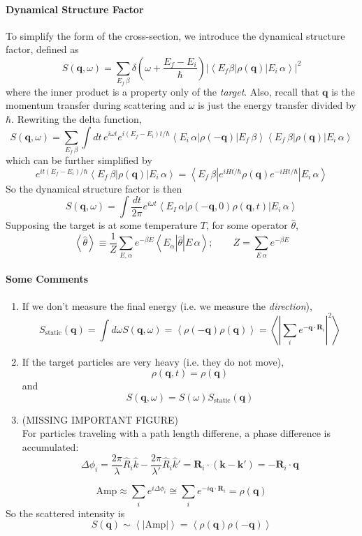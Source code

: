 \documentclass{article}
\begin{document}
			\paragraph{Dynamical Structure Factor} To simplify the form of the cross-section, we introduce the dynamical structure factor, defined as
			$$S(\mathbf{q},\omega)=\sum_{E_f\,\beta}\delta\left(\omega+\frac{E_f-E_i}{\hbar}\right)\left|\left<E_f\beta\left|\rho(\mathbf{q})\right|E_i\,\alpha\right>\right|^2$$
			where the inner product is a property only of the \emph{target}. Also, recall that $\mathbf{q}$ is the momentum transfer during scattering and $\omega$ is just the energy transfer divided by $\hbar$. Rewriting the delta function,
			$$S(\mathbf{q},\omega)=\sum_{E_f\,\beta}\int dt\,e^{i\omega t}e^{i(E_f-E_i)t/\hbar}\left<E_i\,\alpha\left|\rho(-\mathbf{q})\right|E_f\,\beta\right>\left<E_{f}\,\beta\left|\rho(\mathbf{q})\right|E_i\,\alpha\right>$$
			which can be further simplified by
			$$e^{it(E_f-E_i)/\hbar}\left<E_{f}\,\beta\left|\rho(\mathbf{q})\right|E_i\,\alpha\right>=\left<E_{f}\,\beta\left|e^{i Ht/\hbar}\rho(\mathbf{q})e^{-iHt/\hbar}\right|E_i\,\alpha\right>$$
			So the dynamical structure factor is then
			$$S(\mathbf{q},\omega)=\int \frac{dt}{2\pi}e^{i\omega t}\left<E_I\,\alpha\left|\rho(-\mathbf{q},0)\rho(\mathbf{q},t)\right|E_i\,\alpha\right>$$
			Supposing the target is at some temperature $T$, for some operator $\hat{\theta}$,
			$$\left<\hat{\theta}\right>\equiv \frac{1}{Z}\sum_{E,\alpha}e^{-\beta E}\left<E_\alpha\left|\hat{\theta}\right|E\,\alpha\right>;\qquad Z=\sum_{E\,\alpha}e^{-\beta E}$$
			\begin{center}
			\end{center}
			\paragraph{Some Comments}
			\begin{enumerate}
				\item If we don't measure the final energy (i.e. we measure the \emph{direction}),
				$$S_{\mathrm{static}}(\mathbf{q})=\int d\omega S(\mathbf{q},\omega)=\left<\rho(-\mathbf{q})\rho(\mathbf{q})\right>=\left<\left|\sum_ie^{-\mathbf{q}\cdot\mathbf{R}_i}\right|^2\right>$$
				\item If the target particles are very heavy (i.e. they do not move),
				$$\rho(\mathbf{q},t)=\rho(\mathbf{q})$$
				and
				$$S(\mathbf{q},\omega)=S(\omega)S_{\mathrm{static}}(\mathbf{q})$$
				\item (MISSING IMPORTANT FIGURE)\\
				
				\noindent For particles traveling with a path length differene, a phase difference is accumulated:
				$$\Delta \phi_i=\frac{2\pi}{\lambda}\hat{R}_i\hat{k}-\frac{2\pi}{\lambda'}\hat{R}_i\hat{k}'=\mathbf{R}_i\cdot(\mathbf{k}-\mathbf{k}')=-\mathbf{R}_i\cdot\mathbf{q}$$
			\end{enumerate}
			$$\mathrm{Amp}\approx \sum_i e^{i\Delta\phi_i}\cong \sum_ie^{-i\mathbf{q}\cdot\mathbf{R}_i}=\rho(\mathbf{q})$$
			So the scattered intensity is
			$$S(\mathbf{q})\sim\left<\left|\mathrm{Amp}\right|\right>=\left<\rho(\mathbf{q})\rho(-\mathbf{q})\right>$$
\end{document}
